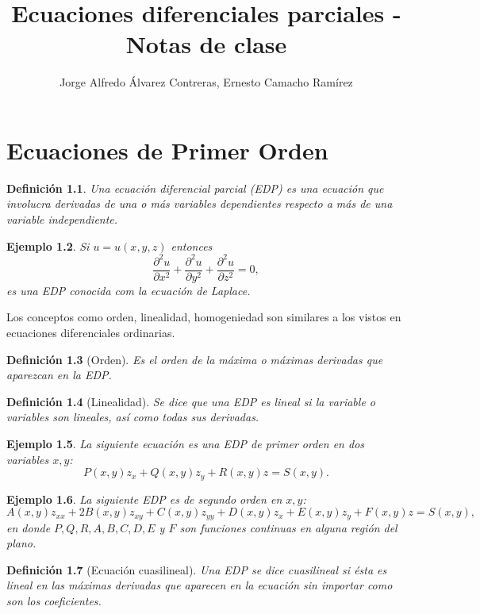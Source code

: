 \documentclass[11pt,letterpaper,draft]{report}
\title{Ecuaciones diferenciales parciales - Notas de clase}
\author{Jorge Alfredo Álvarez Contreras, Ernesto Camacho Ramírez}
\newtheorem{defn}{Definición}[chapter]
\newtheorem{example}[defn]{Ejemplo}
\newcommand\<{\langle}
\renewcommand\>{\rangle}
\begin{document}
\maketitle

\tableofcontents
\listoftodos

\chapter{Ecuaciones de Primer Orden}

\begin{defn}
  Una ecuación diferencial parcial (EDP) es una ecuación 
  que involucra derivadas de una o más variables dependientes 
  respecto a más de una variable independiente.
\end{defn}

\begin{example}
  Si $u = u(x,y,z)$ entonces
  \[
  \frac{\partial^2 u}{\partial x^2} + \frac{\partial^2 u}{\partial y^2} + \frac{\partial^2 u}{\partial z^2} = 0,
  \] es una EDP conocida com la ecuación de Laplace.
\end{example}

Los conceptos como orden, linealidad, homogeniedad son
similares a los vistos en ecuaciones diferenciales
ordinarias.

\begin{defn}[Orden]
  Es el orden de la máxima o máximas derivadas que aparezcan
  en la EDP.
\end{defn}

\begin{defn}[Linealidad]
  Se dice que una EDP es lineal si la variable o variables
  son \textit{lineales}, así como \textit{todas} sus
  derivadas.
\end{defn}

\begin{example}
  La siguiente ecuación es una EDP de primer orden en dos
  variables $x,y$:
  \[
    P(x,y) z_x + Q(x,y) z_y + R(x,y) z = S(x,y).
  \] 
\end{example}

\begin{example}
  La siguiente EDP es de segundo orden en $x,y$:
  \[
    A(x,y) z_{xx} + 2B(x,y) z_{xy} + C(x,y) z_{yy} + D(x,y)
    z_x + E(x,y) z_y + F(x,y) z = S(x,y),
  \] en donde $P,Q,R,A,B,C,D,E$ y $F$ son funciones
  continuas en alguna región del plano.
\end{example}

\begin{defn}[Ecuación cuasilineal]
  Una EDP se dice cuasilineal si ésta es lineal en las
  máximas derivadas que aparecen en la ecuación sin importar
  como son los coeficientes.
\end{defn}
\end{document}

